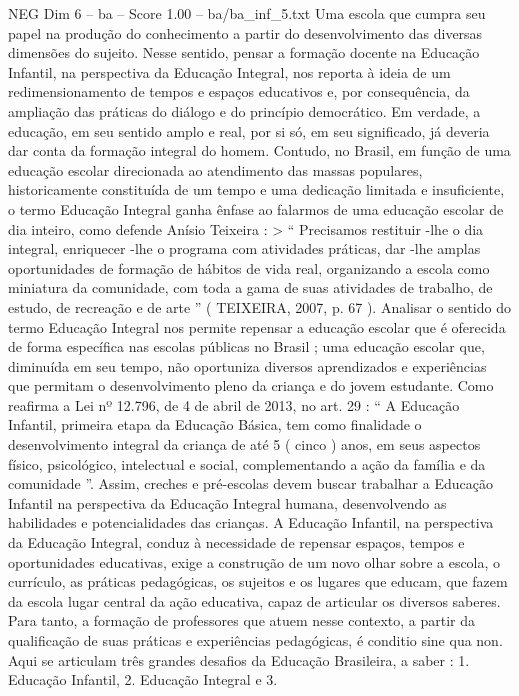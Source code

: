 \begin{textsample}{NEG Dim 6 – ba – Score 1.00 – ba/ba\_inf\_5.txt}
Uma escola que cumpra seu papel na produção do conhecimento a partir do desenvolvimento das diversas dimensões do sujeito.
Nesse sentido, pensar a formação docente na Educação Infantil, na perspectiva da Educação Integral, nos reporta à ideia de um redimensionamento de tempos e espaços educativos e, por consequência, da ampliação das práticas do diálogo e do princípio democrático.
Em verdade, a educação, em seu sentido amplo e real, por si só, em seu significado, já deveria dar conta da formação integral do homem.
Contudo, no Brasil, em função de uma educação escolar direcionada ao atendimento das massas populares, historicamente constituída de um tempo e uma dedicação limitada e insuficiente, o termo Educação Integral ganha ênfase ao falarmos de uma educação escolar de dia inteiro, como defende Anísio Teixeira : > “ Precisamos restituir -lhe o dia integral, enriquecer -lhe o programa com atividades práticas, dar -lhe amplas oportunidades de formação de hábitos de vida real, organizando a escola como miniatura da comunidade, com toda a gama de suas atividades de trabalho, de estudo, de recreação e de arte ” ( TEIXEIRA, 2007, p. 67 ).
Analisar o sentido do termo Educação Integral nos permite repensar a educação escolar que é oferecida de forma específica nas escolas públicas no Brasil ; uma educação escolar que, diminuída em seu tempo, não oportuniza diversos aprendizados e experiências que permitam o desenvolvimento pleno da criança e do jovem estudante.
Como reafirma a Lei nº 12.796, de 4 de abril de 2013, no art. 29 : “ A Educação Infantil, primeira etapa da Educação Básica, tem como finalidade o desenvolvimento integral da criança de até 5 ( cinco ) anos, em seus aspectos físico, psicológico, intelectual e social, complementando a ação da família e da comunidade ”.
Assim, creches e pré-escolas devem buscar trabalhar a Educação Infantil na perspectiva da Educação Integral humana, desenvolvendo as habilidades e potencialidades das crianças.
A Educação Infantil, na perspectiva da Educação Integral, conduz à necessidade de repensar espaços, tempos e oportunidades educativas, exige a construção de um novo olhar sobre a escola, o currículo, as práticas pedagógicas, os sujeitos e os lugares que educam, que fazem da escola lugar central da ação educativa, capaz de articular os diversos saberes.
Para tanto, a formação de professores que atuem nesse contexto, a partir da qualificação de suas práticas e experiências pedagógicas, é conditio sine qua non.
Aqui se articulam três grandes desafios da Educação Brasileira, a saber : 1.
Educação Infantil, 2.
Educação Integral e 3.

\end{textsample}
